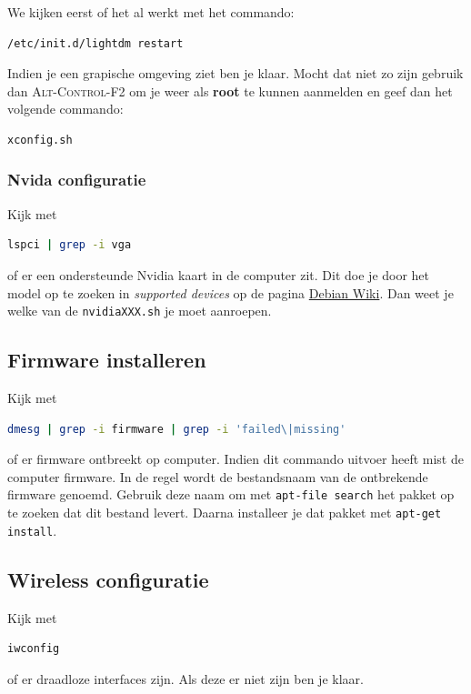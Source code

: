 \documentclass[12pt,a4paper]{article}
\begin{document}
We kijken eerst of het al werkt met het commando:

\begin{lstlisting}[language=bash]
/etc/init.d/lightdm restart
\end{lstlisting}

Indien je een grapische omgeving ziet ben je klaar. Mocht dat niet zo zijn gebruik dan \textsc{Alt-Control-F2} om je weer als \textbf{root} te kunnen aanmelden en geef dan het volgende commando:


\begin{lstlisting}[language=bash]
xconfig.sh
\end{lstlisting}

\subsubsection{Nvida configuratie}

Kijk met 
\begin{lstlisting}[language=bash]
lspci | grep -i vga
\end{lstlisting}
of er een ondersteunde Nvidia kaart in de computer zit. Dit doe je door het model op te zoeken in \textit{supported devices} op de pagina \href{https://wiki.debian.org/NvidiaGraphicsDrivers}{Debian Wiki}. Dan weet je welke van de  \texttt{nvidiaXXX.sh} je moet aanroepen.

\subsection{Firmware installeren}
\label{ssec:Firmware}
Kijk met 
\begin{lstlisting}[language=bash]
dmesg | grep -i firmware | grep -i 'failed\|missing'
\end{lstlisting}
of er firmware ontbreekt op computer.
Indien dit commando uitvoer heeft mist de computer firmware. In de regel wordt de bestandsnaam van de ontbrekende firmware genoemd. Gebruik deze naam om met \texttt{apt-file search} het pakket op te zoeken dat dit bestand levert. Daarna installeer je dat pakket met \texttt{apt-get install}.

\subsection{Wireless configuratie}
Kijk met 
\begin{lstlisting}[language=bash]
iwconfig
\end{lstlisting}
of er draadloze interfaces zijn. Als deze er niet zijn ben je klaar. 
\end{document}
